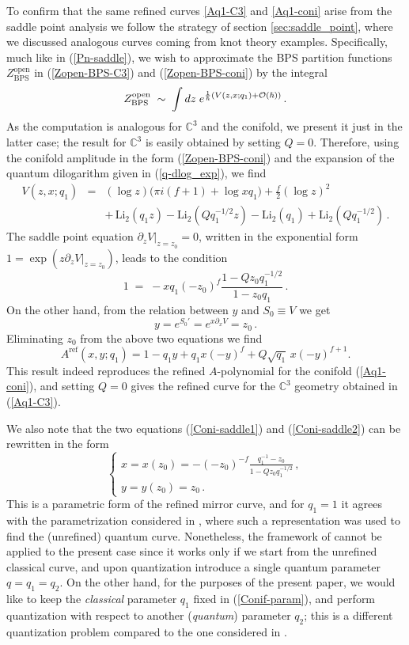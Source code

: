 \documentclass[hyper,letterpaper]{JHEP3}
\newcommand{\bea}{\begin{eqnarray}}
\newcommand{\eea}{\end{eqnarray}}
\newcommand{\be}{\begin{equation}}
\newcommand{\ee}{\end{equation}}
\newcommand{\C}{{\mathbb C}}
\begin{document}
To confirm that the same refined curves \eqref{Aq1-C3} and \eqref{Aq1-coni}
arise from the saddle point analysis we follow the strategy of section \ref{sec:saddle_point},
where we discussed analogous curves coming from knot theory examples.
Specifically, much like in (\ref{Pn-saddle}), we wish to approximate the BPS partition functions
$Z_{\text{BPS}}^{\text{open}}$ in (\ref{Zopen-BPS-C3}) and (\ref{Zopen-BPS-coni}) by the integral
\be
Z_{\text{BPS}}^{\text{open}} \; \sim \;
\int dz\; e^{\frac{1}{\hbar}\left(V(z,x;q_1)+{\cal
						 O}(\hbar)\right)} \,.     \label{Zopen-BPS-saddle}
\ee
As the computation is analogous for $\C^3$ and the conifold, we present it just in the latter case; the result for $\C^3$ is easily obtained by setting $Q=0$. Therefore, using the conifold amplitude in the form (\ref{Zopen-BPS-coni}) and the expansion of the quantum dilogarithm given in (\ref{q-dlog_exp}), we find
\bea
V(z,x;q_1) & = & (\log z)\big(\pi i (f+1) + \log x q_1   \big) + \frac{f}{2} (\log z)^2 \nonumber \\
& & + \, \textrm{Li}_2(q_1 z) - \textrm{Li}_2(Q q_1^{-1/2} z) - \textrm{Li}_2(q_1) + \textrm{Li}_2(Q q_1^{-1/2}) \,. \nonumber
\eea
The saddle point equation $\partial_z V |_{z=z_0}=0$, written in the exponential form $1=\exp (z \partial_z V |_{z=z_0})$, leads to the condition
\be
1 \; = \; -x q_1 (-z_0)^f  \frac{1 - Q z_0 q_1^{-1/2}}{1 - z_0 q_1} \,.    \label{Coni-saddle1}
\ee
On the other hand, from the relation between $y$ and $S_0\equiv V$ we get
\be
y = e^{S_0'} = e^{x\partial_x V} = z_0 \,.     \label{Coni-saddle2}
\ee
Eliminating $z_0$ from the above two equations we find
\be
A^{\text{ref}} (x,y;q_1) = 1 - q_1 y + q_1 x (-y)^f + Q \sqrt{q_1} \, x (-y)^{f+1}.
\ee
This result indeed reproduces the refined $A$-polynomial for the conifold (\ref{Aq1-coni}),
and setting $Q=0$ gives the refined curve for the $\C^3$ geometry obtained in (\ref{Aq1-C3}).

We also note that the two equations (\ref{Coni-saddle1}) and (\ref{Coni-saddle2}) can be rewritten in the form
\be
\left\{\begin{array}{l} x=x(z_0) = -(-z_0)^{-f} \frac{q_1^{-1}-z_0}{1 - Q z_0 q_1^{-1/2}} \,, \\
y=y(z_0) = z_0  \,. \end{array} \right.
\label{Conif-param}
\ee
This is a parametric form of the refined mirror curve, and for $q_1=1$
it agrees with the parametrization considered in \cite{abmodel},
where such a representation was used to find the (unrefined) quantum curve.
Nonetheless, the framework of \cite{abmodel} cannot be applied to the present case
since it works only if we start from the unrefined classical curve, and upon quantization introduce a single quantum parameter $q=q_1=q_2$.
On the other hand, for the purposes of the present paper, we would like to keep the \emph{classical} parameter $q_1$ fixed in (\ref{Conif-param}),
and perform quantization with respect to another (\emph{quantum}) parameter $q_2$; this is a different quantization problem
compared to the one considered in \cite{abmodel}.
\end{document}
